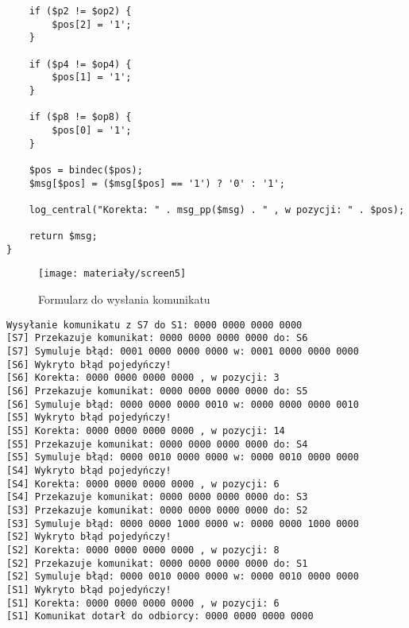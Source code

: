 \begin{empty}
\begin{verbatim}
	if ($p2 != $op2) {
		$pos[2] = '1';
	}
	
	if ($p4 != $op4) {
		$pos[1] = '1';
	}
	
	if ($p8 != $op8) {
		$pos[0] = '1';
	}
	
	$pos = bindec($pos);
	$msg[$pos] = ($msg[$pos] == '1') ? '0' : '1';
	
	log_central("Korekta: " . msg_pp($msg) . " , w pozycji: " . $pos);
	
	return $msg;
}

	\end{verbatim}
	\vspace{-10pt}
\end{empty}

\begin{figure}[H]
	\centering
	\vspace{-10pt}
	\texttt{[image: materiały/screen5]}
	\caption{Formularz do wysłania komunikatu}
\end{figure}

\begin{empty}
	\begin{verbatim}
Wysyłanie komunikatu z S7 do S1: 0000 0000 0000 0000
[S7] Przekazuje komunikat: 0000 0000 0000 0000 do: S6
[S7] Symuluje błąd: 0001 0000 0000 0000 w: 0001 0000 0000 0000
[S6] Wykryto błąd pojedyńczy!
[S6] Korekta: 0000 0000 0000 0000 , w pozycji: 3
[S6] Przekazuje komunikat: 0000 0000 0000 0000 do: S5
[S6] Symuluje błąd: 0000 0000 0000 0010 w: 0000 0000 0000 0010
[S5] Wykryto błąd pojedyńczy!
[S5] Korekta: 0000 0000 0000 0000 , w pozycji: 14
[S5] Przekazuje komunikat: 0000 0000 0000 0000 do: S4
[S5] Symuluje błąd: 0000 0010 0000 0000 w: 0000 0010 0000 0000
[S4] Wykryto błąd pojedyńczy!
[S4] Korekta: 0000 0000 0000 0000 , w pozycji: 6
[S4] Przekazuje komunikat: 0000 0000 0000 0000 do: S3
[S3] Przekazuje komunikat: 0000 0000 0000 0000 do: S2
[S3] Symuluje błąd: 0000 0000 1000 0000 w: 0000 0000 1000 0000
[S2] Wykryto błąd pojedyńczy!
[S2] Korekta: 0000 0000 0000 0000 , w pozycji: 8
[S2] Przekazuje komunikat: 0000 0000 0000 0000 do: S1
[S2] Symuluje błąd: 0000 0010 0000 0000 w: 0000 0010 0000 0000
[S1] Wykryto błąd pojedyńczy!
[S1] Korekta: 0000 0000 0000 0000 , w pozycji: 6
[S1] Komunikat dotarł do odbiorcy: 0000 0000 0000 0000
	\end{verbatim}
	\vspace{-10pt}
\end{empty}

